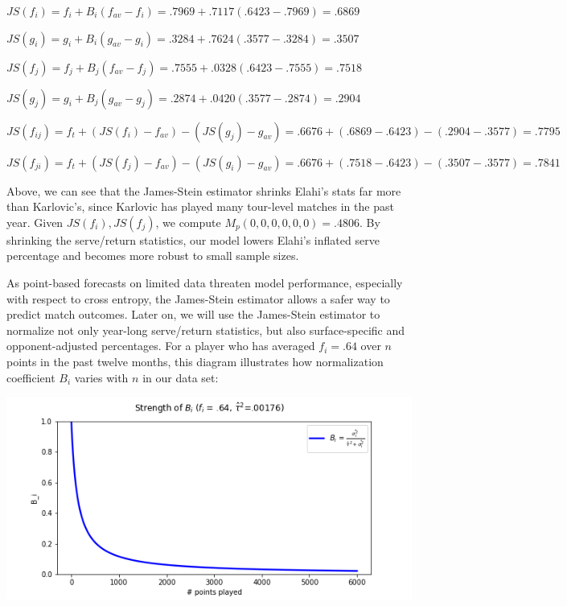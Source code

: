 \documentclass[chapterprefix=false]{report}
\begin{document}
\begin{center}
$JS(f_i) = f_i + B_i(f_{av}-f_i) = .7969 + .7117(.6423-.7969) = .6869$

$JS(g_i) = g_i + B_i(g_{av}-g_i) = .3284 + .7624(.3577-.3284) = .3507$

$JS(f_j) = f_j + B_j(f_{av}-f_j) = .7555 + .0328(.6423-.7555) = .7518$

$JS(g_j) = g_i + B_j(g_{av}-g_j) = .2874 + .0420(.3577-.2874) = .2904$

$JS(f_{ij}) = f_t + (JS(f_i)-f_{av})-(JS(g_j)-g_{av}) = .6676 + (.6869-.6423) - (.2904-.3577) = .7795$

$JS(f_{ji}) = f_t + (JS(f_j)-f_{av})-(JS(g_i)-g_{av}) = .6676 + (.7518-.6423) - (.3507-.3577) = .7841$

\end{center}

Above, we can see that the James-Stein estimator shrinks Elahi's stats far more than Karlovic's, since Karlovic has played many tour-level matches in the past year. Given $JS(f_i),JS(f_j)$, we compute $M_p(0,0,0,0,0,0) = .4806$. By shrinking the serve/return statistics, our model lowers Elahi's inflated serve percentage and becomes more robust to small sample sizes.

As point-based forecasts on limited data threaten model performance, especially with respect to cross entropy, the James-Stein estimator allows a safer way to predict match outcomes. Later on, we will use the James-Stein estimator to normalize not only year-long serve/return statistics, but also surface-specific and opponent-adjusted percentages. For a player who has averaged $f_i=.64$ over $n$ points in the past twelve months, this diagram illustrates how normalization coefficient $B_i$ varies with $n$ in our data set:

\includegraphics[scale=.7]{norm_fig}


\end{document}
